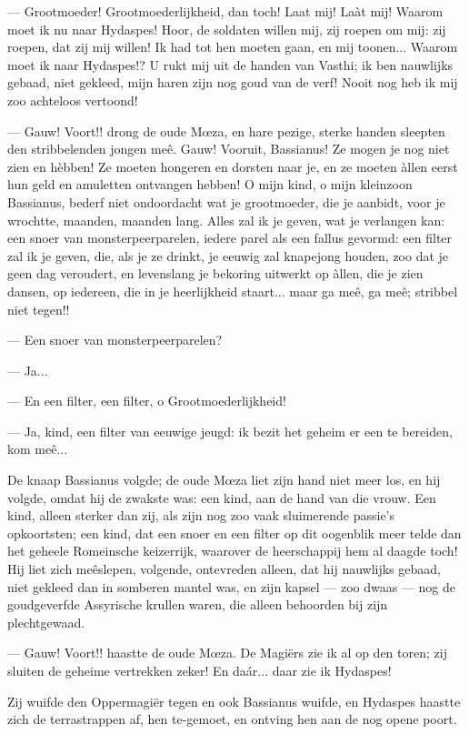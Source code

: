 \documentclass[a4paper, 12pt, oneside, dutch]{article}
\begin{document}
--- Grootmoeder! Grootmoederlijkheid, dan toch! Laat mij! Laàt mij! Waarom moet ik nu naar Hydaspes! Hoor, de soldaten willen mij, zij roepen om mij: zij roepen, dat zij mij willen! Ik had tot hen moeten gaan, en mij toonen... Waarom moet ik naar Hydaspes!? U rukt mij uit de handen van Vasthi; ik ben nauwlijks gebaad, niet gekleed, mijn haren zijn nog goud van de verf! Nooit nog heb ik mij zoo achteloos vertoond!

--- Gauw! Voort!! drong de oude Mœza, en hare pezige, sterke handen sleepten den stribbelenden jongen meê. Gauw! Vooruit, Bassianus! Ze mogen je nog niet zien en hèbben! Ze moeten hongeren en dorsten naar je, en ze moeten àllen eerst hun geld en amuletten ontvangen hebben! O mijn kind, o mijn kleinzoon Bassianus, bederf niet ondoordacht wat je grootmoeder, die je aanbidt, voor je wrochtte, maanden, maanden lang. Alles zal ik je geven, wat je verlangen kan: een snoer van monsterpeerparelen, iedere parel als een fallus gevormd: een filter zal ik je geven, die, als je ze drinkt, je eeuwig zal knapejong houden, zoo dat je geen dag veroudert, en levenslang je bekoring uitwerkt op àllen, die je zien dansen, op iedereen, die in je heerlijkheid staart... maar ga meê, ga meê; stribbel niet tegen!!

--- Een snoer van monsterpeerparelen?

--- Ja...

--- En een filter, een filter, o Grootmoederlijkheid!

--- Ja, kind, een filter van eeuwige jeugd: ik bezit het geheim er een te bereiden, kom meê...

De knaap Bassianus volgde; de oude Mœza liet zijn hand niet meer los, en hij volgde, omdat hij de zwakste was: een kind, aan de hand van die vrouw. Een kind, alleen sterker dan zij, als zijn nog zoo vaak sluimerende passie's opkoortsten; een kind, dat een snoer en een filter op dit oogenblik meer telde dan het geheele Romeinsche keizerrijk, waarover de heerschappij hem al daagde toch! Hij liet zich meêslepen, volgende, ontevreden alleen, dat hij nauwlijks gebaad, niet gekleed dan in somberen mantel was, en zijn kapsel --- zoo dwaas --- nog de goudgeverfde Assyrische krullen waren, die alleen behoorden bij zijn plechtgewaad.

--- Gauw! Voort!! haastte de oude Mœza. De Magiërs zie ik al op den toren; zij sluiten de geheime vertrekken zeker! En daár... daar zie ik Hydaspes!

Zij wuifde den Oppermagiër tegen en ook Bassianus wuifde, en Hydaspes haastte zich de terrastrappen af, hen te-gemoet, en ontving hen aan de nog opene poort.
\end{document}
